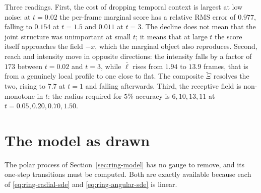 Three readings. First, the cost of dropping temporal context is largest at low
noise: at $t = 0.02$ the per-frame marginal score has a relative RMS error of
$0.977$, falling to $0.154$ at $t = 1.5$ and $0.011$ at $t = 3$. The decline
does not mean that the joint structure was unimportant at small $t$; it means
that at large $t$ the score itself approaches the field $-x$, which the
marginal object also reproduces. Second, reach and intensity move in opposite
directions: the intensity falls by a factor of $173$ between $t = 0.02$ and
$t = 3$, while $\bar\ell$ rises from $1.94$ to $13.9$ frames, that is from a
genuinely local profile to one close to flat. The composite $\widetilde\Xi$
resolves the two, rising to $7.7$ at $t = 1$ and falling afterwards. Third, the
receptive field is non-monotone in $t$: the radius required for $5\%$ accuracy
is $6, 10, 13, 11$ at $t = 0.05, 0.20, 0.70, 1.50$.

\section{The model as drawn}\label{sec:ring-polar}

The polar process of Section~\ref{sec:ring-model} has no gauge to remove, and
its one-step transitions must be computed. Both are exactly available because
each of \eqref{eq:ring-radial-sde} and \eqref{eq:ring-angular-sde} is linear.

